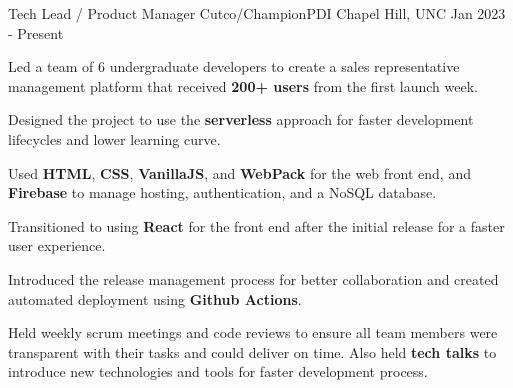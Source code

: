 
\begin{cventries}
  \cventry
    {Tech Lead / Product Manager} %
    {Cutco/ChampionPDI} %
    {Chapel Hill, UNC} %
    {Jan 2023 - Present} %
    {
      \begin{cvitems} %
        \item {Led a team of 6 undergraduate developers to create a sales representative management platform that received \textbf{200+ users} from the first launch week.}
        \item {Designed the project to use the \textbf{serverless} approach for faster development lifecycles and lower learning curve.}
        \item {Used \textbf{HTML}, \textbf{CSS}, \textbf{VanillaJS}, and \textbf{WebPack} for the web front end, and \textbf{Firebase} to manage hosting, authentication, and a NoSQL database.}
        \item {Transitioned to using \textbf{React} for the front end after the initial release for a faster user experience.}
        \item {Introduced the release management process for better collaboration and created automated deployment using \textbf{Github Actions}.}
        \item {Held weekly scrum meetings and code reviews to ensure all team members were transparent with their tasks and could deliver on time. Also held \textbf{tech talks} to introduce new technologies and tools for faster development process.}
      \end{cvitems}
    }


\end{cventries}
